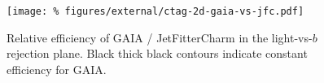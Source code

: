 \begin{figure}
  \begin{center}
  \texttt{[image: \%
    figures/external/ctag-2d-gaia-vs-jfc.pdf]}
  \caption[Charm jet efficiency comparison in duel-rejection plane]{%
    Relative efficiency of GAIA / JetFitterCharm in the light-vs-$b$ rejection plane. Black thick black contours indicate constant efficiency for GAIA.}
  \label{fig:ctag-gaia-vs-jfc}
  \end{center}
\end{figure}


